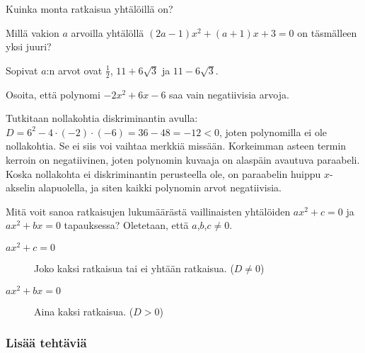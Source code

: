 \begin{tehtavasivu}
\begin{tehtava}
	Kuinka monta ratkaisua yhtälöillä on?
	\begin{vastaus}
	\end{vastaus}
\end{tehtava}

\begin{tehtava}
	Millä vakion $a$ arvoilla yhtälöllä $(2a-1)x^2+(a+1)x+3=0$ on täsmälleen yksi juuri?
	\begin{vastaus}
		Sopivat $a$:n arvot ovat $\frac{1}{2}$, $11+6\sqrt{3}$ ja $11-6\sqrt{3}$.
	\end{vastaus}
\end{tehtava}

\begin{tehtava}
Osoita, että polynomi $-2x^2+6x-6$ saa vain negatiivisia arvoja.
	\begin{vastaus}
	Tutkitaan nollakohtia diskriminantin avulla: $D=6^2-4\cdot (-2)\cdot(-6)=36-48=-12<0$, joten polynomilla ei ole nollakohtia. Se ei siis voi vaihtaa merkkiä missään. Korkeimman asteen termin kerroin on negatiivinen, joten polynomin kuvaaja on alaspäin avautuva paraabeli. Koska nollakohta ei diskriminantin perusteella ole, on paraabelin huippu $x$-akselin alapuolella, ja siten kaikki polynomin arvot negatiivisia.
	\end{vastaus}
\end{tehtava}

\begin{tehtava}
	Mitä voit sanoa ratkaisujen lukumäärästä vaillinaisten yhtälöiden $ax^2+c=0$ ja $ax^2+bx=0$ tapauksessa? Oletetaan, että $a$,$b$,$c \neq 0$.
	\begin{vastaus}
		\begin{description}
			\item[$ax^2+c=0$] Joko kaksi ratkaisua tai ei yhtään ratkaisua. ($D \neq 0$)
			\item[$ax^2+bx=0$] Aina kaksi ratkaisua. ($D > 0$)
		\end{description}
	\end{vastaus}
\end{tehtava}

\subsubsection*{Lisää tehtäviä}


\end{tehtavasivu}
